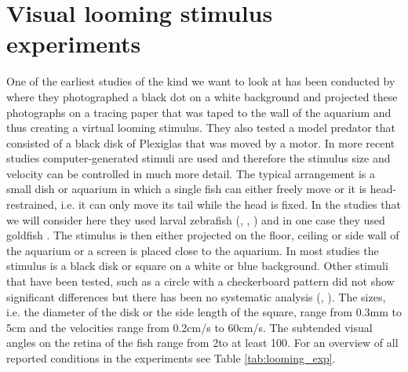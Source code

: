 \documentclass[a4paper,10pt,hidelinks]{scrreprt}
\begin{document}
	\section{Visual looming stimulus experiments}
	One of the earliest studies of the kind we want to look at has been conducted by 
	\cite{Dill1974} where they photographed a black dot on a white background and projected these 
	photographs on a tracing paper that was taped to the wall of the aquarium and thus creating a 
	virtual looming stimulus.
	They also tested a model predator that consisted of a black disk of Plexiglas that was moved by 
	a motor.
	In more recent studies computer-generated stimuli are used and therefore the stimulus size 
	and velocity can be controlled in much more detail.
	The typical arrangement is a small dish or aquarium in which a single fish can either freely 
	move or it is head-restrained, i.e. it can only move its tail while the head is fixed. 
	In the studies that we will consider here they used larval zebrafish (\cite{Temizer2015}, 
	\cite{Dunn2016}, \cite{Bhattacharyya2017}) and in one case they used goldfish 
	\citep{Preuss2006}.
	The stimulus is then either projected on the floor, ceiling or side wall of the aquarium or a 
	screen is placed close to the aquarium.
	In most studies the stimulus is a black disk or square on a white or blue background.
	Other stimuli that have been tested, such as a circle with a checkerboard pattern did not show 
	significant differences but there has been no systematic analysis (\cite{Preuss2006}, 
	\cite{Dunn2016}).
	The sizes, i.e. the diameter of the disk or the side length of the square, range from 0.3mm to 
	5cm and the velocities range from 0.2cm/s to 60cm/s.
	The subtended visual angles on the retina of the fish range from 2\textdegree to at least 
	100\textdegree.
	For an overview of all reported conditions in the experiments see Table \ref{tab:looming_exp}.\\
\end{document}
